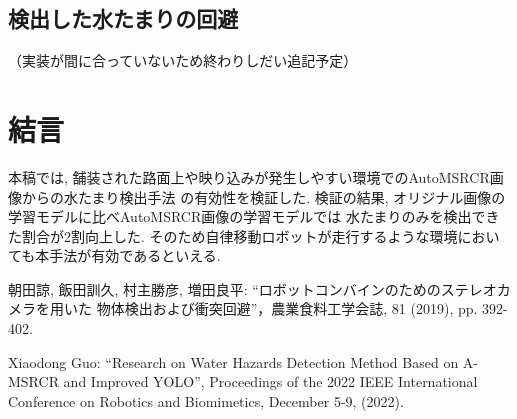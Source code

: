 \documentclass[10pt]{jarticle}
\begin{document}
    \subsection{検出した水たまりの回避}
    （実装が間に合っていないため終わりしだい追記予定）

    \section{結言}%
    本稿では, 舗装された路面上や映り込みが発生しやすい環境でのAutoMSRCR画像からの水たまり検出手法
    の有効性を検証した. 検証の結果, オリジナル画像の学習モデルに比べAutoMSRCR画像の学習モデルでは
    水たまりのみを検出できた割合が2割向上した. 
    そのため自律移動ロボットが走行するような環境においても本手法が有効であるといえる. 


    



    
    
 
    \vspace{5truemm}
    {\footnotesize
        \begin{thebibliography}{99}

            朝田諒, 飯田訓久, 村主勝彦, 増田良平: ``ロボットコンバインのためのステレオカメラを用いた
            物体検出および衝突回避''，農業食料工学会誌, 81 (2019), pp. 392-402.

            Xiaodong Guo: ``Research on Water Hazards Detection Method Based on A-MSRCR and Improved YOLO'', 
            Proceedings of the 2022 IEEE International Conference on Robotics and Biomimetics, 
            December 5-9, (2022). 

            
            
        \end{thebibliography}
    }
    \normalsize
    
\end{document}
